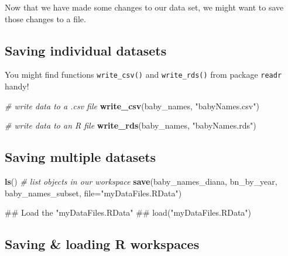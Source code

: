 \documentclass[]{book}
\newenvironment{Shaded}{\begin{snugshade}}{\end{snugshade}}
\newcommand{\KeywordTok}[1]{\textcolor[rgb]{0.13,0.29,0.53}{\textbf{#1}}}
\newcommand{\DataTypeTok}[1]{\textcolor[rgb]{0.13,0.29,0.53}{#1}}
\newcommand{\StringTok}[1]{\textcolor[rgb]{0.31,0.60,0.02}{#1}}
\newcommand{\CommentTok}[1]{\textcolor[rgb]{0.56,0.35,0.01}{\textit{#1}}}
\newcommand{\NormalTok}[1]{#1}
\begin{document}
Now that we have made some changes to our data set, we might want to
save those changes to a file.

\subsection{Saving individual
datasets}\label{saving-individual-datasets}

You might find functions \texttt{write\_csv()} and \texttt{write\_rds()}
from package \texttt{readr} handy!

\begin{Shaded}
\begin{Highlighting}[]
\CommentTok{# write data to a .csv file}
\KeywordTok{write_csv}\NormalTok{(baby_names, }\StringTok{"babyNames.csv"}\NormalTok{)}
\end{Highlighting}
\end{Shaded}

\begin{Shaded}
\begin{Highlighting}[]
\CommentTok{# write data to an R file}
\KeywordTok{write_rds}\NormalTok{(baby_names, }\StringTok{"babyNames.rds"}\NormalTok{)}
\end{Highlighting}
\end{Shaded}

\subsection{Saving multiple datasets}\label{saving-multiple-datasets}

\begin{Shaded}
\begin{Highlighting}[]
\KeywordTok{ls}\NormalTok{() }\CommentTok{# list objects in our workspace}
\KeywordTok{save}\NormalTok{(baby_names_diana, bn_by_year, baby_names_subset, }\DataTypeTok{file=}\StringTok{"myDataFiles.RData"}\NormalTok{)  }
\end{Highlighting}
\end{Shaded}

\begin{Shaded}
\begin{Highlighting}[]
\NormalTok{## Load the "myDataFiles.RData"}
\NormalTok{## load("myDataFiles.RData") }
\end{Highlighting}
\end{Shaded}

\subsection{Saving \& loading R
workspaces}\label{saving-loading-r-workspaces}
\end{document}
